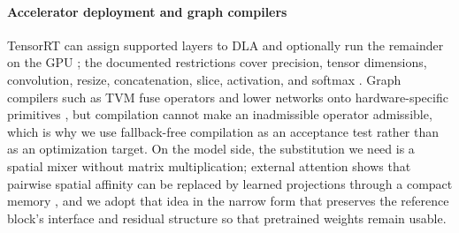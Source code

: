 \paragraph*{Accelerator deployment and graph compilers}
TensorRT can assign supported layers to DLA and optionally run the remainder on
the GPU \cite{nvidia_dla_build}; the documented restrictions cover precision,
tensor dimensions, convolution, resize, concatenation, slice, activation, and
softmax \cite{nvidia_dla_working,nvidia_dla_restrictions}. Graph compilers such
as TVM fuse operators and lower networks onto hardware-specific primitives
\cite{chen2018tvm}, but compilation cannot make an inadmissible operator
admissible, which is why we use fallback-free compilation as an acceptance test
rather than as an optimization target. On the model side, the substitution we
need is a spatial mixer without matrix multiplication; external attention shows
that pairwise spatial affinity can be replaced by learned projections through a
compact memory \cite{guo2023external}, and we adopt that idea in the narrow form
that preserves the reference block's interface and residual structure so that
pretrained weights remain usable.
